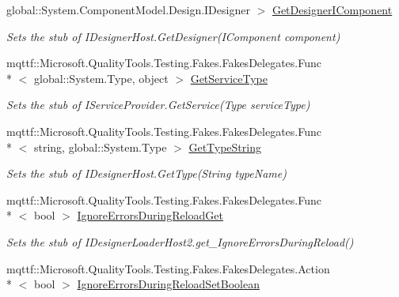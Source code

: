 \begin{DoxyCompactItemize}
global\-::\-System.\-Component\-Model.\-Design.\-I\-Designer $>$ \hyperlink{class_system_1_1_component_model_1_1_design_1_1_serialization_1_1_fakes_1_1_stub_i_designer_loader_host2_ae066608b8b804e2fa54da7e04adc2809}{Get\-Designer\-I\-Component}
\begin{DoxyCompactList}\small\item\em Sets the stub of I\-Designer\-Host.\-Get\-Designer(\-I\-Component component)\end{DoxyCompactList}\item 
mqttf\-::\-Microsoft.\-Quality\-Tools.\-Testing.\-Fakes.\-Fakes\-Delegates.\-Func\\*
$<$ global\-::\-System.\-Type, object $>$ \hyperlink{class_system_1_1_component_model_1_1_design_1_1_serialization_1_1_fakes_1_1_stub_i_designer_loader_host2_ab7c8a897e4fcb11b226cef32fa7e1d4c}{Get\-Service\-Type}
\begin{DoxyCompactList}\small\item\em Sets the stub of I\-Service\-Provider.\-Get\-Service(\-Type service\-Type)\end{DoxyCompactList}\item 
mqttf\-::\-Microsoft.\-Quality\-Tools.\-Testing.\-Fakes.\-Fakes\-Delegates.\-Func\\*
$<$ string, global\-::\-System.\-Type $>$ \hyperlink{class_system_1_1_component_model_1_1_design_1_1_serialization_1_1_fakes_1_1_stub_i_designer_loader_host2_ac48f5dd5f90c92bcfd0bb41387c31df7}{Get\-Type\-String}
\begin{DoxyCompactList}\small\item\em Sets the stub of I\-Designer\-Host.\-Get\-Type(\-String type\-Name)\end{DoxyCompactList}\item 
mqttf\-::\-Microsoft.\-Quality\-Tools.\-Testing.\-Fakes.\-Fakes\-Delegates.\-Func\\*
$<$ bool $>$ \hyperlink{class_system_1_1_component_model_1_1_design_1_1_serialization_1_1_fakes_1_1_stub_i_designer_loader_host2_ad5410d5fa7aa966c91589771d33202ca}{Ignore\-Errors\-During\-Reload\-Get}
\begin{DoxyCompactList}\small\item\em Sets the stub of I\-Designer\-Loader\-Host2.\-get\-\_\-\-Ignore\-Errors\-During\-Reload()\end{DoxyCompactList}\item 
mqttf\-::\-Microsoft.\-Quality\-Tools.\-Testing.\-Fakes.\-Fakes\-Delegates.\-Action\\*
$<$ bool $>$ \hyperlink{class_system_1_1_component_model_1_1_design_1_1_serialization_1_1_fakes_1_1_stub_i_designer_loader_host2_a19abb4c123a8fd4e399a7cddc1ed7cbd}{Ignore\-Errors\-During\-Reload\-Set\-Boolean}

\end{DoxyCompactItemize}
